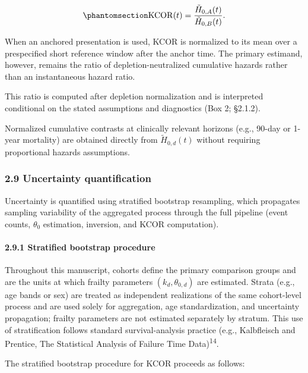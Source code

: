 \documentclass[
]{article}
\begin{document}
\begin{equation}\protect\phantomsection\label{eq:kcor-estimator}{
\mathrm{KCOR}(t) = \frac{\tilde H_{0,A}(t)}{\tilde H_{0,B}(t)}.
}\end{equation}

When an anchored presentation is used, KCOR is normalized to its mean
over a prespecified short reference window after the anchor time. The
primary estimand, however, remains the ratio of depletion-neutralized
cumulative hazards rather than an instantaneous hazard ratio.

This ratio is computed after depletion normalization and is interpreted
conditional on the stated assumptions and diagnostics (Box 2; §2.1.2).

Normalized cumulative contrasts at clinically relevant horizons (e.g.,
90-day or 1-year mortality) are obtained directly from
\(\tilde H_{0,d}(t)\) without requiring proportional hazards
assumptions.

\subsubsection{2.9 Uncertainty
quantification}\label{uncertainty-quantification}

Uncertainty is quantified using stratified bootstrap resampling, which
propagates sampling variability of the aggregated process through the
full pipeline (event counts, \(\theta_0\) estimation, inversion, and
KCOR computation).

\paragraph{2.9.1 Stratified bootstrap
procedure}\label{stratified-bootstrap-procedure}

Throughout this manuscript, cohorts define the primary comparison groups
and are the units at which frailty parameters \((k_d, \theta_{0,d})\)
are estimated. Strata (e.g., age bands or sex) are treated as
independent realizations of the same cohort-level process and are used
solely for aggregation, age standardization, and uncertainty
propagation; frailty parameters are not estimated separately by stratum.
This use of stratification follows standard survival-analysis practice
(e.g., Kalbfleisch and Prentice, The Statistical Analysis of Failure
Time Data)\textsuperscript{14}.

The stratified bootstrap procedure for KCOR proceeds as follows:
\end{document}
